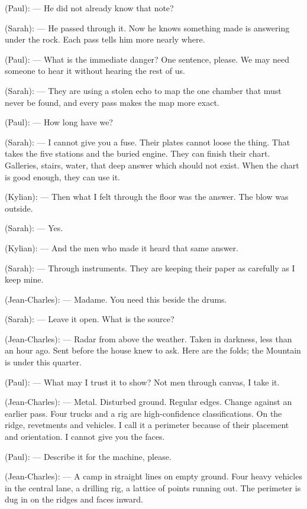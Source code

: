 \begin{room}
(Paul): --- He did not already know that note?

(Sarah): --- He passed through it. Now he knows something made is answering under the rock. Each pass tells him more nearly where.

(Paul): --- What is the immediate danger? One sentence, please. We may need someone to hear it without hearing the rest of us.

(Sarah): --- They are using a stolen echo to map the one chamber that must never be found, and every pass makes the map more exact.

(Paul): --- How long have we?

(Sarah): --- I cannot give you a fuse. Their plates cannot loose the thing. That takes the five stations and the buried engine. They can finish their chart. Galleries, stairs, water, that deep answer which should not exist. When the chart is good enough, they can use it.

(Kylian): --- Then what I felt through the floor was the answer. The blow was outside.

(Sarah): --- Yes.

(Kylian): --- And the men who made it heard that same answer.

(Sarah): --- Through instruments. They are keeping their paper as carefully as I keep mine.

\centerline{}

(Jean-Charles): --- Madame. You need this beside the drums.

(Sarah): --- Leave it open. What is the source?

(Jean-Charles): --- Radar from above the weather. Taken in darkness, less than an hour ago. Sent before the house knew to ask. Here are the folds; the Mountain is under this quarter.

(Paul): --- What may I trust it to show? Not men through canvas, I take it.

(Jean-Charles): --- Metal. Disturbed ground. Regular edges. Change against an earlier pass. Four trucks and a rig are high-confidence classifications. On the ridge, revetments and vehicles. I call it a perimeter because of their placement and orientation. I cannot give you the faces.

(Paul): --- Describe it for the machine, please.

(Jean-Charles): --- A camp in straight lines on empty ground. Four heavy vehicles in the central lane, a drilling rig, a lattice of points running out. The perimeter is dug in on the ridges and faces inward.


\end{room}
